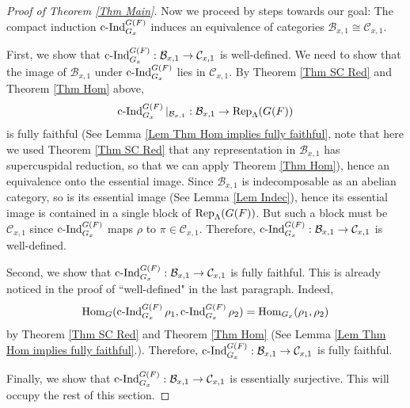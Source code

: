 		\begin{proof}[Proof of Theorem \ref{Thm Main}]
			
			Now we proceed by steps towards our goal: The compact induction $\operatorname{\operatorname{c-Ind}}_{G_x}^{G(F)}$ induces an equivalence of categories $\mathcal{B}_{x,1} \cong \mathcal{C}_{x,1}$. 
			
			First, we show that $\operatorname{\operatorname{c-Ind}}_{G_x}^{G(F)}: \mathcal{B}_{x,1} \to \mathcal{C}_{x,1}$ is well-defined. We need to show that the image of $\mathcal{B}_{x,1}$ under $\operatorname{\operatorname{c-Ind}}_{G_x}^{G(F)}$ lies in $\mathcal{C}_{x,1}$. By Theorem \ref{Thm SC Red} and Theorem \ref{Thm Hom} above, $$\operatorname{\operatorname{c-Ind}}_{G_x}^{G(F)}|_{\mathcal{B}_{x,1}}: \mathcal{B}_{x,1} \to \operatorname{\operatorname{Rep}}_{\Lambda}(G(F))$$
			is fully faithful (See Lemma \ref{Lem Thm Hom implies fully faithful}, note that here we used Theorem \ref{Thm SC Red} that any representation in $\mathcal{B}_{x,1}$ has supercuspidal reduction, so that we can apply Theorem \ref{Thm Hom}), hence an equivalence onto the essential image. Since $\mathcal{B}_{x,1}$ is indecomposable as an abelian category, so is its essential image (See Lemma \ref{Lem Indec}), hence its essential image is contained in a single block of $\operatorname{\operatorname{Rep}}_{\Lambda}(G(F))$. But such a block must be $\mathcal{C}_{x,1}$ since $\operatorname{\operatorname{c-Ind}}_{G_x}^{G(F)}$ maps $\rho$ to $\pi \in \mathcal{C}_{x,1}$. Therefore, $\operatorname{\operatorname{c-Ind}}_{G_x}^{G(F)}: \mathcal{B}_{x,1} \to \mathcal{C}_{x,1}$ is well-defined.
			
			Second, we show that $\operatorname{\operatorname{c-Ind}}_{G_x}^{G(F)}: \mathcal{B}_{x,1} \to \mathcal{C}_{x,1}$ is fully faithful. This is already noticed in the proof of ``well-defined" in the last paragraph. Indeed, 
			$$\operatorname{\operatorname{Hom}}_G(\operatorname{\operatorname{c-Ind}}_{G_x}^{G(F)}\rho_1, \operatorname{\operatorname{c-Ind}}_{G_x}^{G(F)}\rho_2)=\operatorname{\operatorname{Hom}}_{G_x}(\rho_1, \rho_2)$$
			by Theorem \ref{Thm SC Red} and Theorem \ref{Thm Hom} (See Lemma \ref{Lem Thm Hom implies fully faithful}.). Therefore, $\operatorname{\operatorname{c-Ind}}_{G_x}^{G(F)}: \mathcal{B}_{x,1} \to \mathcal{C}_{x,1}$ is fully faithful.
			
			Finally, we show that $\operatorname{\operatorname{c-Ind}}_{G_x}^{G(F)}: \mathcal{B}_{x,1} \to \mathcal{C}_{x,1}$ is essentially surjective. This will occupy the rest of this section. 
			

\end{proof}
